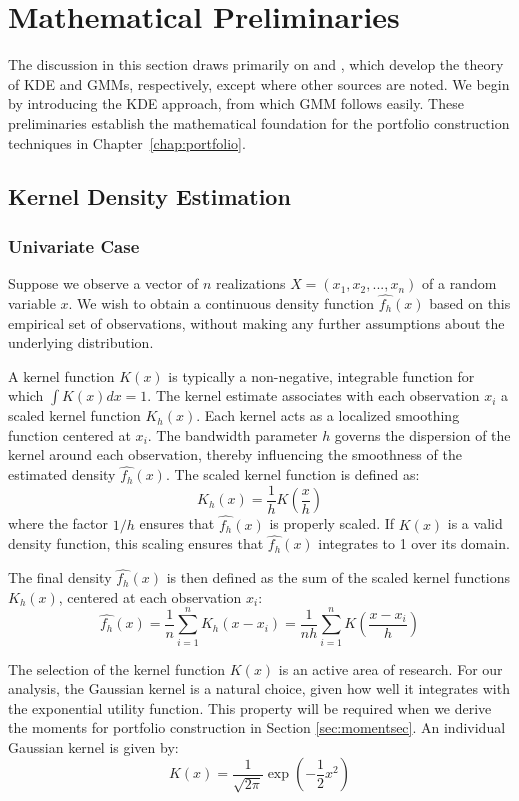 \chapter{Mathematical Preliminaries}
\label{chap:math}

The discussion in this section draws primarily on \cite{KernelDensityEstimators2015} and \cite{OtherApplications2015}, which develop the theory of KDE and GMMs, respectively, except where other sources are noted. We begin by introducing the KDE approach, from which GMM follows easily. These preliminaries establish the mathematical foundation for the portfolio construction techniques in Chapter~\ref{chap:portfolio}.

\section{Kernel Density Estimation}
\subsection{Univariate Case}
\label{sec:univkde}

Suppose we observe a vector of $n$ realizations $X=(x_1,x_2,...,x_n)$ of a random variable $x$. We wish to obtain a continuous density function $\hat{f_h}(x)$ based on this empirical set of observations, without making any further assumptions about the underlying distribution. 

A kernel function $K(x)$ is typically a non-negative, integrable function for which $\int K(x)dx = 1$. The kernel estimate associates with each observation $x_i$ a scaled kernel function $K_h(x)$. Each kernel acts as a localized smoothing function centered at $x_i$. The bandwidth parameter $h$ governs the dispersion of the kernel around each observation, thereby influencing the smoothness of the estimated density $\hat{f_h}(x)$. The scaled kernel function is defined as:
$$\displaystyle K_h(x)=\frac{1}{h}K\left(\frac{x}{h}\right)$$
where the factor $1/h$ ensures that $\hat{f_h}(x)$ is properly scaled. If $K(x)$ is a valid density function, this scaling ensures that $\hat{f_h}(x)$ integrates to 1 over its domain.

The final density $\hat{f_h}(x)$ is then defined as the sum of the scaled kernel functions $K_h(x)$, centered at each observation $x_i$:
$$\displaystyle\hat{f_h}(x)=\frac{1}{n}\sum_{i=1}^{n}K_h(x-x_i)=\frac{1}{nh}\sum_{i=1}^{n}K\left(\frac{x-x_i}{h}\right)$$

The selection of the kernel function $K(x)$ is an active area of research. For our analysis, the Gaussian kernel is a natural choice, given how well it integrates with the exponential utility function. This property will be required when we derive the moments for portfolio construction in Section \ref{sec:momentsec}. An individual Gaussian kernel is given by:
$$\displaystyle K(x)=\frac{1}{\sqrt{2\pi}}\exp\left(-\frac{1}{2}x^2\right)$$


